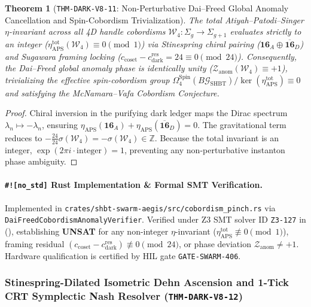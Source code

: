 \documentclass[11pt,onecolumn]{article}
\newtheorem{theorem}{Theorem}
\begin{document}
\begin{theorem}[\texttt{THM-DARK-V8-11}: Non-Perturbative Dai--Freed Global Anomaly Cancellation and Spin-Cobordism Trivialization]
\label{thm:dark_v8_11}
The total Atiyah--Patodi--Singer $\eta$-invariant across all 4D handle cobordisms $\mathcal{W}_4: \Sigma_g \to \Sigma_{g+1}$ evaluates strictly to an integer ($\eta_{\text{APS}}^{\text{tot}}(\mathcal{W}_4) \equiv 0 \pmod 1$) via Stinespring chiral pairing ($\mathbf{16}_A \oplus \overline{\mathbf{16}}_D$) and Sugawara framing locking ($c_{\text{coset}} - c_{\text{dark}}^{\text{res}} = 24 \equiv 0 \pmod{24}$). Consequently, the Dai--Freed global anomaly phase is identically unity ($\mathcal{Z}_{\text{anom}}(\mathcal{W}_4) \equiv +1$), trivializing the effective spin-cobordism group $\Omega_4^{\text{Spin}}(B\mathcal{G}_{\text{SHBT}})/\ker(\eta_{\text{APS}}^{\text{tot}}) \equiv 0$ and satisfying the McNamara--Vafa Cobordism Conjecture.
\end{theorem}

\begin{proof}
Chiral inversion in the purifying dark ledger maps the Dirac spectrum $\lambda_n \mapsto -\lambda_n$, ensuring $\eta_{\text{APS}}(\mathbf{16}_A) + \eta_{\text{APS}}(\overline{\mathbf{16}}_D) = 0$. The gravitational term reduces to $-\frac{24}{24}\sigma(\mathcal{W}_4) = -\sigma(\mathcal{W}_4) \in \mathbb{Z}$. Because the total invariant is an integer, $\exp(2\pi i \cdot \text{integer}) = 1$, preventing any non-perturbative instanton phase ambiguity.
\end{proof}

\paragraph{\texttt{\#![no\_std]} Rust Implementation \& Formal SMT Verification.}
Implemented in \texttt{crates/shbt-swarm-aegis/src/cobordism\_pinch.rs} via \texttt{DaiFreedCobordismAnomalyVerifier}. Verified under Z3 SMT solver ID \texttt{Z3-127} in  (), establishing \textbf{UNSAT} for any non-integer $\eta$-invariant ($\eta_{\text{APS}}^{\text{tot}} \not\equiv 0 \pmod 1$), framing residual $(c_{\text{coset}} - c_{\text{dark}}^{\text{res}}) \not\equiv 0 \pmod{24}$, or phase deviation $\mathcal{Z}_{\text{anom}} \neq +1$. Hardware qualification is certified by HIL gate \texttt{GATE-SWARM-406}.


\subsubsection{Stinespring-Dilated Isometric Dehn Ascension and 1-Tick CRT Symplectic Nash Resolver (\texttt{THM-DARK-V8-12})}
\label{subsubsec:thm_dark_v8_12}
\end{document}
